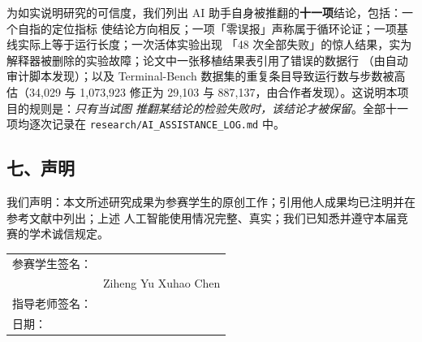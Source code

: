 \documentclass[10pt]{article}
\begin{document}
为如实说明研究的可信度，我们列出 AI 助手自身被推翻的\textbf{十一项}结论，包括：一个自指的定位指标
使结论方向相反；一项「零误报」声称属于循环论证；一项基线实际上等于运行长度；一次活体实验出现
「48 次全部失败」的惊人结果，实为解释器被删除的实验故障；论文中一张移植结果表引用了错误的数据行
（由自动审计脚本发现）；以及 Terminal-Bench 数据集的重复条目导致运行数与步数被高估（34{,}029 与
1{,}073{,}923 修正为 29{,}103 与 887{,}137，由合作者发现）。这说明本项目的规则是：\emph{只有当试图
推翻某结论的检验失败时，该结论才被保留}。全部十一项均逐次记录在
\texttt{research/AI\_ASSISTANCE\_LOG.md} 中。

\subsection*{七、声明}

我们声明：本文所述研究成果为参赛学生的原创工作；引用他人成果均已注明并在参考文献中列出；上述
人工智能使用情况完整、真实；我们已知悉并遵守本届竞赛的学术诚信规定。

\vspace{1.2em}
\noindent
\begin{tabular}{ll}
参赛学生签名： & \underline{\hspace{4.5cm}} \quad \underline{\hspace{4.5cm}} \\[10pt]
              & \hfill Ziheng Yu \hspace{2.2cm} Xuhao Chen \\[14pt]
指导老师签名： & \underline{\hspace{4.5cm}} \\[14pt]
日期：        & \underline{\hspace{4.5cm}} \\
\end{tabular}
\end{document}
